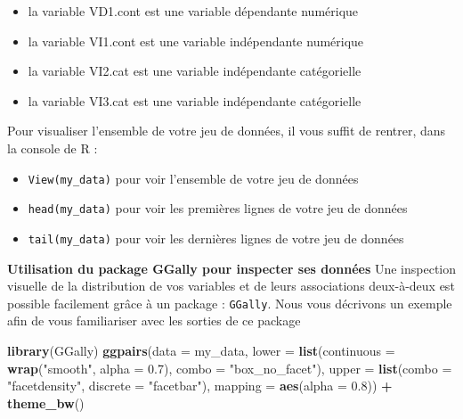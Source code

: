 \documentclass[
]{book}
\newenvironment{Shaded}{\begin{snugshade}}{\end{snugshade}}
\newcommand{\DataTypeTok}[1]{\textcolor[rgb]{0.13,0.29,0.53}{#1}}
\newcommand{\FloatTok}[1]{\textcolor[rgb]{0.00,0.00,0.81}{#1}}
\newcommand{\KeywordTok}[1]{\textcolor[rgb]{0.13,0.29,0.53}{\textbf{#1}}}
\newcommand{\NormalTok}[1]{#1}
\newcommand{\OperatorTok}[1]{\textcolor[rgb]{0.81,0.36,0.00}{\textbf{#1}}}
\newcommand{\StringTok}[1]{\textcolor[rgb]{0.31,0.60,0.02}{#1}}
\providecommand{\tightlist}{%
  \setlength{\itemsep}{0pt}\setlength{\parskip}{0pt}}
\begin{document}
\begin{itemize}
\tightlist
\item
  la variable VD1.cont est une variable dépendante numérique
\item
  la variable VI1.cont est une variable indépendante numérique
\item
  la variable VI2.cat est une variable indépendante catégorielle
\item
  la variable VI3.cat est une variable indépendante catégorielle
\end{itemize}

Pour visualiser l'ensemble de votre jeu de données, il vous suffit de rentrer, dans la console de R :

\begin{itemize}
\tightlist
\item
  \texttt{View(my\_data)} pour voir l'ensemble de votre jeu de données
\item
  \texttt{head(my\_data)} pour voir les premières lignes de votre jeu de données
\item
  \texttt{tail(my\_data)} pour voir les dernières lignes de votre jeu de données
\end{itemize}

\textbf{Utilisation du package GGally pour inspecter ses données}
Une inspection visuelle de la distribution de vos variables et de leurs associations deux-à-deux est possible facilement grâce à un package : \texttt{GGally}. Nous vous décrivons un exemple afin de vous familiariser avec les sorties de ce package

\begin{Shaded}
\begin{Highlighting}[]
\KeywordTok{library}\NormalTok{(GGally)}
\KeywordTok{ggpairs}\NormalTok{(}\DataTypeTok{data =}\NormalTok{ my_data,}
        \DataTypeTok{lower =} \KeywordTok{list}\NormalTok{(}\DataTypeTok{continuous =} \KeywordTok{wrap}\NormalTok{(}\StringTok{"smooth"}\NormalTok{, }\DataTypeTok{alpha =} \FloatTok{0.7}\NormalTok{), }\DataTypeTok{combo =} \StringTok{"box_no_facet"}\NormalTok{),}
        \DataTypeTok{upper =} \KeywordTok{list}\NormalTok{(}\DataTypeTok{combo =} \StringTok{"facetdensity"}\NormalTok{, }\DataTypeTok{discrete =} \StringTok{"facetbar"}\NormalTok{), }
        \DataTypeTok{mapping =} \KeywordTok{aes}\NormalTok{(}\DataTypeTok{alpha =} \FloatTok{0.8}\NormalTok{)) }\OperatorTok{+}\StringTok{ }\KeywordTok{theme_bw}\NormalTok{()}
\end{Highlighting}
\end{Shaded}
\end{document}
